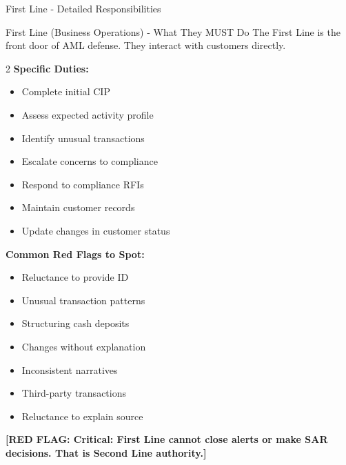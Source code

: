 \documentclass[11pt,a4paper]{beamer}
\newcommand{\redflag}[1]{\textcolor{red!80!black}{\textbf{[RED FLAG: #1]}}}
\begin{document}
	\begin{frame}{First Line - Detailed Responsibilities}
		\begin{block}{First Line (Business Operations) - What They MUST Do}
			The First Line is the front door of AML defense. They interact with customers directly.
		\end{block}
		\begin{multicols}{2}
			\textbf{Specific Duties:}
			\begin{itemize}
				\item Complete initial CIP
				\item Assess expected activity profile
				\item Identify unusual transactions
				\item Escalate concerns to compliance
				\item Respond to compliance RFIs
				\item Maintain customer records
				\item Update changes in customer status
			\end{itemize}
			\columnbreak
			\textbf{Common Red Flags to Spot:}
			\begin{itemize}
				\item Reluctance to provide ID
				\item Unusual transaction patterns
				\item Structuring cash deposits
				\item Changes without explanation
				\item Inconsistent narratives
				\item Third-party transactions
				\item Reluctance to explain source
			\end{itemize}
		\end{multicols}
		\redflag{Critical: First Line cannot close alerts or make SAR decisions. That is Second Line authority.}
	\end{frame}
	
\end{document}
